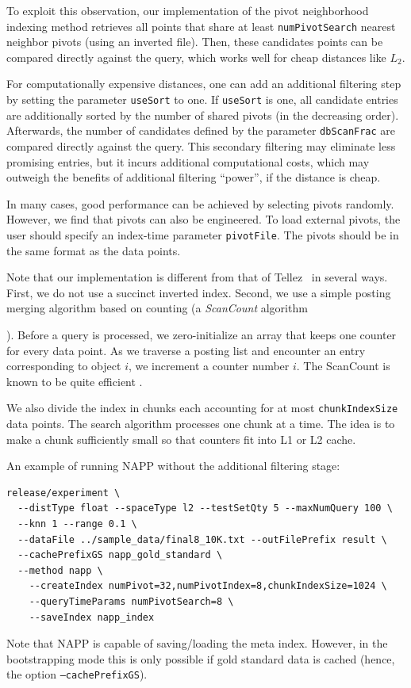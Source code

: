 \documentclass[runningheads,a4paper]{llncs}
\newcommand{\ttt}[1]{\texttt{#1}}
\begin{document}
{To exploit this observation, our implementation of the pivot neighborhood indexing method retrieves all points that 
share at least \ttt{numPivotSearch} nearest neighbor pivots (using an inverted file).
Then, these candidates points can be compared directly against the query,
which works well for cheap distances like $L_2$.

For computationally expensive distances, one can add an additional filtering step by
setting the parameter \ttt{useSort} to one.
If \ttt{useSort} is one, all candidate entries are additionally sorted by the number of shared pivots
(in the decreasing order).
Afterwards, the number of candidates defined by the parameter \ttt{dbScanFrac} are compared directly against the query. 
This secondary filtering may eliminate less promising entries, but it incurs additional
computational costs, which may outweigh the benefits of additional filtering ``power'', if the distance is cheap.

In many cases, good performance can be achieved by selecting pivots randomly. However, we find
that pivots can also be engineered. To load external pivots, the user should specify
an index-time parameter \ttt{pivotFile}. The pivots should be in the same format as the data points.

Note that our implementation is different from that of Tellez~\cite{tellez2013succinct} in several ways.
First, we do not use a succinct inverted index. Second, we use a simple posting merging algorithm
based on counting (a \emph{ScanCount} algorithm}). 
Before a query is processed, we zero-initialize an array that keeps one
counter for every data point. As we traverse a posting list and encounter an entry corresponding to object
$i$, we increment a counter number $i$.
The ScanCount is known to be quite efficient \cite{li2008efficient}.

We also divide the index in chunks each accounting for at most \ttt{chunkIndexSize} data points.
The search algorithm processes one chunk at a time. The idea is to make a chunk sufficiently small
so that counters fit into L1 or L2  cache.

An example of running NAPP without the additional filtering stage:
{
\footnotesize
\begin{verbatim}
release/experiment \
  --distType float --spaceType l2 --testSetQty 5 --maxNumQuery 100 \
  --knn 1 --range 0.1 \
  --dataFile ../sample_data/final8_10K.txt --outFilePrefix result \
  --cachePrefixGS napp_gold_standard \
  --method napp \
    --createIndex numPivot=32,numPivotIndex=8,chunkIndexSize=1024 \
    --queryTimeParams numPivotSearch=8 \
    --saveIndex napp_index
\end{verbatim}
}
Note that NAPP is capable of saving/loading the meta index. However, in the bootstrapping
mode this is only possible if gold standard data is cached (hence, the option \ttt{--cachePrefixGS}).
\end{document}

